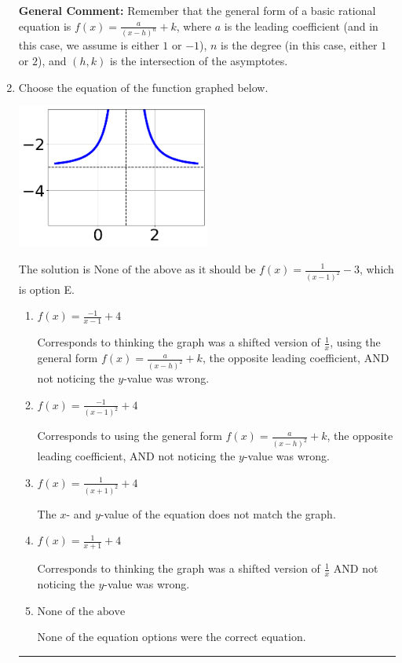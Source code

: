 \documentclass{extbook}[14pt]
\newcommand{\litem}[1]{\item #1

\rule{\textwidth}{0.4pt}}
\begin{document}
\begin{enumerate}
{\textbf{General Comment:} Remember that the general form of a basic rational equation is $ f(x) = \frac{a}{(x-h)^n} + k$, where $a$ is the leading coefficient (and in this case, we assume is either $1$ or $-1$), $n$ is the degree (in this case, either $1$ or $2$), and $(h, k)$ is the intersection of the asymptotes.
}
\litem{
Choose the equation of the function graphed below.

\begin{center}
    \includegraphics[width=0.5\textwidth]{../Figures/rationalGraphToEquationC.png}
\end{center}


The solution is \( \text{None of the above as it should be } f(x) = \frac{1}{(x - 1)^2} - 3 \), which is option E.\begin{enumerate}[label=\Alph*.]
\item \( f(x) = \frac{-1}{x - 1} + 4 \)

Corresponds to thinking the graph was a shifted version of $\frac{1}{x}$, using the general form $f(x) = \frac{a}{(x-h)^2}+k$, the opposite leading coefficient, AND not noticing the $y$-value was wrong.
\item \( f(x) = \frac{-1}{(x - 1)^2} + 4 \)

Corresponds to using the general form $f(x) = \frac{a}{(x-h)^2}+k$, the opposite leading coefficient, AND not noticing the $y$-value was wrong.
\item \( f(x) = \frac{1}{(x + 1)^2} + 4 \)

The $x$- and $y$-value of the equation does not match the graph.
\item \( f(x) = \frac{1}{x + 1} + 4 \)

Corresponds to thinking the graph was a shifted version of $\frac{1}{x}$ AND not noticing the $y$-value was wrong.
\item \( \text{None of the above} \)

None of the equation options were the correct equation.
\end{enumerate}

}
\end{enumerate}
\end{document}
